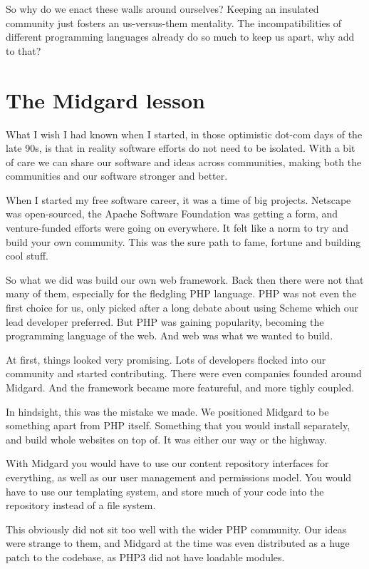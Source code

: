 So why do we enact these walls around ourselves? Keeping an insulated community
just fosters an us-versus-them mentality. The incompatibilities of different
programming languages already do so much to keep us apart, why add to that? 

\section*{The Midgard lesson}

What I wish I had known when I started, in those optimistic dot-com days of the late
90s, is that in reality software efforts do not need to be isolated. With a bit
of care we can share our software and ideas across communities, making both the
communities and our software stronger and better.

When I started my free software career, it was a time of big projects. Netscape
was open-sourced, the Apache Software Foundation was getting a form, and
venture-funded efforts were going on everywhere. It felt like a norm to try and
build your own community. This was the sure path to fame, fortune and building
cool stuff.

So what we did was build our own web framework. Back then there were not that
many of them, especially for the fledgling PHP language. PHP was not even the
first choice for us, only picked after a long debate about using Scheme which
our lead developer preferred. But PHP was gaining popularity, becoming
the programming language of the web. And web was what we wanted to build.

At first, things looked very promising. Lots of developers flocked into our
community and started contributing. There were even companies founded around
Midgard. And the framework became more featureful, and more tighly coupled.

In hindsight, this was the mistake we made. We positioned Midgard to be
something apart from PHP itself. Something that you would install separately,
and build whole websites on top of. It was either our way or the highway.

With Midgard you would have to use our content repository interfaces for
everything, as well as our user management and permissions model. You would have
to use our templating system, and store much of your code into the repository
instead of a file system.

This obviously did not sit too well with the wider PHP community. Our ideas were
strange to them, and Midgard at the time was even distributed as a huge patch to
the codebase, as PHP3 did not have loadable modules.

